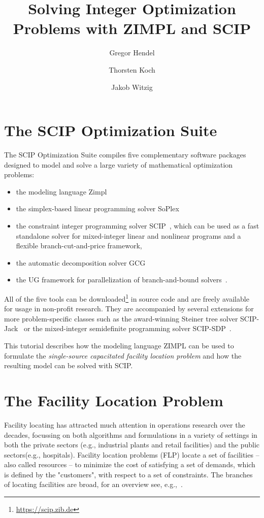 \documentclass[a4paper,10pt]{article}
\title{Solving Integer Optimization Problems with ZIMPL and SCIP}
\author{Gregor Hendel\and
        Thorsten Koch\and
        Jakob Witzig}
\begin{document}
\maketitle

\section{The SCIP Optimization Suite}

The SCIP Optimization Suite compiles five complementary software packages designed to model and solve a large variety of mathematical optimization problems:
\begin{itemize}
  \item the modeling language Zimpl~\cite{koch2004rapid}
  \item the simplex-based linear programming solver SoPlex~\cite{Wunderling1996}
  \item the constraint integer programming solver SCIP~\cite{Achterberg2009}, which can be used as a fast standalone solver for mixed-integer linear and nonlinear programs and a flexible branch-cut-and-price framework,
  \item the automatic decomposition solver GCG~\cite{GamrathLuebbecke2010}
  \item the UG framework for parallelization of branch-and-bound solvers~\cite{Shinano2018}.
\end{itemize}
All of the five tools can be downloaded\footnote{\url{https://scip.zib.de}} in source code and are freely available for usage
in non-profit research.
They are accompanied by several extensions for more problem-specific classes
such as the award-winning Steiner tree solver SCIP-Jack~\cite{Gamrath2017scipjack}
or the mixed-integer semidefinite programming solver SCIP-SDP~\cite{GallyPfetschUlbrich2016}.

This tutorial describes how the modeling language ZIMPL can be used to formulate the \emph{single-source capacitated facility location problem}
and how the resulting model can be solved with SCIP.

\section{The Facility Location Problem}

Facility locating has attracted much attention in operations research over the decades,
focussing on both algorithms and formulations in a variety of settings in both the private sectors (e.g., industrial plants and retail facilities) and the public sectors(e.g., hospitals).
Facility location problems (FLP) locate a set of facilities -- also called resources -- to minimize the cost of satisfying a set of demands,
which is defined by the "customers", with respect to a set of constraints.
The branches of locating facilities are broad, for an overview see, e.g.,~\cite{aikens1985facility,brandeau1989overview}.
\end{document}
